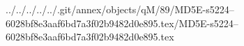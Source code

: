 ../../../../../.git/annex/objects/qM/89/MD5E-s5224--6028bf8e3aaf6bd7a3f02b9482d0e895.tex/MD5E-s5224--6028bf8e3aaf6bd7a3f02b9482d0e895.tex